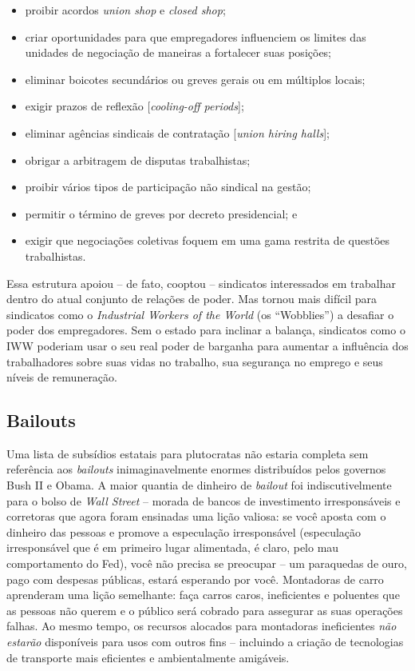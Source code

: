\begin{itemize}
\item proibir acordos \emph{union shop} e \emph{closed shop};
\item criar oportunidades para que empregadores influenciem os limites das unidades de negociação de maneiras a fortalecer suas posições;
\item eliminar boicotes secundários ou greves gerais ou em múltiplos locais;
\item exigir prazos de reflexão [\emph{cooling-off periods}];
\item eliminar agências sindicais de contratação [\emph{union hiring halls}];
\item obrigar a arbitragem de disputas trabalhistas;
\item proibir vários tipos de participação não sindical na gestão;
\item permitir o término de greves por decreto presidencial; e
\item exigir que negociações coletivas foquem em uma gama restrita de questões trabalhistas.
\end{itemize}

Essa estrutura apoiou -- de fato, cooptou -- sindicatos interessados em trabalhar dentro do atual conjunto de relações de poder. Mas tornou mais difícil para sindicatos como o \emph{Industrial Workers of the World} (os ``Wobblies'') a desafiar o poder dos empregadores. Sem o estado para inclinar a balança, sindicatos como o IWW poderiam usar o seu real poder de barganha para aumentar a influência dos trabalhadores sobre suas vidas no trabalho, sua segurança no emprego e seus níveis de remuneração.

\subsection*{Bailouts}

Uma lista de subsídios estatais para plutocratas não estaria completa sem referência aos \emph{bailouts} inimaginavelmente enormes distribuídos pelos governos Bush II e Obama. A maior quantia de dinheiro de \emph{bailout} foi indiscutivelmente para o bolso de \emph{Wall Street} -- morada de bancos de investimento irresponsáveis e corretoras que agora foram ensinadas uma lição valiosa: se você aposta com o dinheiro das pessoas e promove a especulação irresponsável (especulação irresponsável que é em primeiro lugar alimentada, é claro, pelo mau comportamento do Fed), você não precisa se preocupar -- um paraquedas de ouro, pago com despesas públicas, estará esperando por você. Montadoras de carro aprenderam uma lição semelhante: faça carros caros, ineficientes e poluentes que as pessoas não querem e o público será cobrado para assegurar as suas operações falhas. Ao mesmo tempo, os recursos alocados para montadoras ineficientes \emph{não estarão} disponíveis para usos com outros fins -- incluindo a criação de tecnologias de transporte mais eficientes e ambientalmente amigáveis.

